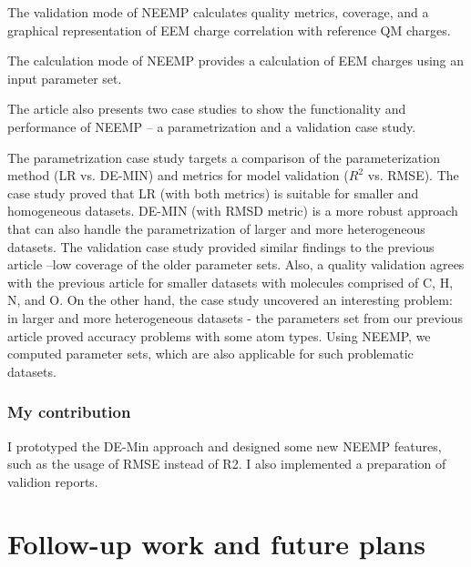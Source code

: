 The validation mode of NEEMP calculates quality metrics, coverage, and a
graphical representation of EEM charge correlation with reference QM charges.

The calculation mode of NEEMP provides a calculation of EEM charges using an
input parameter set.

The article also presents two case studies to show the functionality and
performance of NEEMP – a parametrization and a validation case study.

The parametrization case study targets a comparison of the parameterization
method (LR vs. DE-MIN) and metrics for model validation ($R^2$ vs. RMSE).
The case study proved that LR (with both metrics) is suitable for smaller
and homogeneous datasets. DE-MIN (with RMSD metric) is a more robust approach
that can also handle the parametrization of larger and more heterogeneous
datasets. The validation case study provided similar findings to the previous
article –low coverage of the older parameter sets. Also, a quality validation
agrees with the previous article for smaller datasets with molecules comprised
of C, H, N, and O. On the other hand, the case study uncovered an interesting
problem: in larger and more heterogeneous datasets - the parameters set from
our previous article proved accuracy problems with some atom types. Using NEEMP,
we computed parameter sets, which are also applicable for such problematic
datasets.

\subsection{My contribution}

I prototyped the DE-Min approach and designed some new NEEMP features, such as
the usage of RMSE instead of R2. I also implemented a preparation of validion
reports.

\chapter{Follow-up work and future plans}
